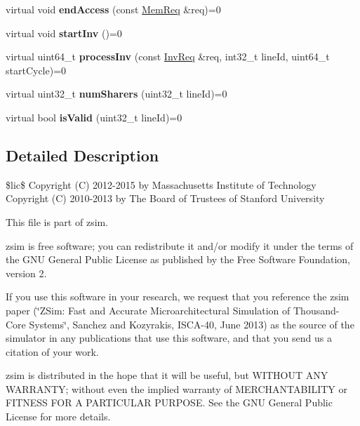 \begin{DoxyCompactItemize}
\item 
\hypertarget{classCC_a66848e057fd8894a77a28e797dbc155c}{virtual void {\bfseries end\-Access} (const \hyperlink{structMemReq}{Mem\-Req} \&req)=0}\label{classCC_a66848e057fd8894a77a28e797dbc155c}

\item 
\hypertarget{classCC_ac2219b6d1f3fea343d37c80cee92b93a}{virtual void {\bfseries start\-Inv} ()=0}\label{classCC_ac2219b6d1f3fea343d37c80cee92b93a}

\item 
\hypertarget{classCC_aa3689bb729527bf2ced5a7020f9fdf65}{virtual uint64\-\_\-t {\bfseries process\-Inv} (const \hyperlink{structInvReq}{Inv\-Req} \&req, int32\-\_\-t line\-Id, uint64\-\_\-t start\-Cycle)=0}\label{classCC_aa3689bb729527bf2ced5a7020f9fdf65}

\item 
\hypertarget{classCC_a369786ed281101d04db2d841b21fd58f}{virtual uint32\-\_\-t {\bfseries num\-Sharers} (uint32\-\_\-t line\-Id)=0}\label{classCC_a369786ed281101d04db2d841b21fd58f}

\item 
\hypertarget{classCC_ad27aac34c05038196e4b59ce97e63a71}{virtual bool {\bfseries is\-Valid} (uint32\-\_\-t line\-Id)=0}\label{classCC_ad27aac34c05038196e4b59ce97e63a71}

\end{DoxyCompactItemize}


\subsection{Detailed Description}
\$lic\$ Copyright (C) 2012-\/2015 by Massachusetts Institute of Technology Copyright (C) 2010-\/2013 by The Board of Trustees of Stanford University

This file is part of zsim.

zsim is free software; you can redistribute it and/or modify it under the terms of the G\-N\-U General Public License as published by the Free Software Foundation, version 2.

If you use this software in your research, we request that you reference the zsim paper (\char`\"{}\-Z\-Sim\-: Fast and Accurate Microarchitectural Simulation of
\-Thousand-\/\-Core Systems\char`\"{}, Sanchez and Kozyrakis, I\-S\-C\-A-\/40, June 2013) as the source of the simulator in any publications that use this software, and that you send us a citation of your work.

zsim is distributed in the hope that it will be useful, but W\-I\-T\-H\-O\-U\-T A\-N\-Y W\-A\-R\-R\-A\-N\-T\-Y; without even the implied warranty of M\-E\-R\-C\-H\-A\-N\-T\-A\-B\-I\-L\-I\-T\-Y or F\-I\-T\-N\-E\-S\-S F\-O\-R A P\-A\-R\-T\-I\-C\-U\-L\-A\-R P\-U\-R\-P\-O\-S\-E. See the G\-N\-U General Public License for more details.

